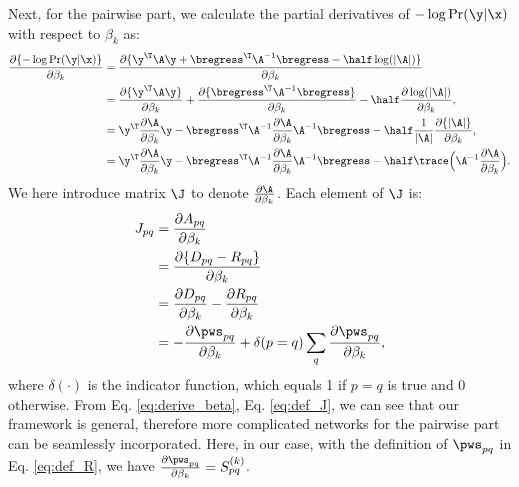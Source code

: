 Next, for the pairwise part, we calculate the  partial derivatives of $-\log\Pr(\y|\x)$ with respect to $\beta_k$ as:
\begin{align}  \label{eq:derive_beta}
\frac{\partial \{ -\log\Pr(\y|\x)\} }{\partial \beta_k} &= \frac{\partial \{\y^\T \A \y + \bregress ^\T \A^{-1} \bregress - \half\log(|\A|)\}}{\partial \beta_k}   \notag \\
&= \frac{\partial \{ \y^\T \A \y \}}{\partial \beta_k} +  \frac{\partial \{\bregress ^\T \A^{-1} \bregress\}}{\partial \beta_k} - \half \frac{\partial \log(|\A|)}{\partial \beta_k}, \notag \\
&=\y^\T\frac{\partial  \A }{\partial \beta_k}\y - \bregress^\T \A^{-1} \frac{\partial \A }{\partial \beta_k} \A^{-1} \bregress  - \half \frac{1}{|\A|} \frac{\partial \{|\A|\} }{\partial \beta_k}, \notag \\
&=\y^\T \frac{\partial  \A }{\partial \beta_k} \y - \bregress^\T \A^{-1} \frac{\partial \A }{\partial \beta_k} \A^{-1} \bregress  - \half \trace \Big ( \A^{-1}  \frac{\partial \A} {\partial \beta_k} \Big ).
\end{align}
We here introduce matrix $\J$ to denote $\frac{\partial  \A }{\partial \beta_k}$. Each element of $\J$ is:
\begin{align}  \label{eq:def_J}
J_{pq} &= \frac{\partial A_{pq}}{\partial \beta_k}  \notag \\
&= \frac{\partial \{ D_{pq} - R_{pq} \} }{\partial \beta_k}  \notag \\
&= \frac{\partial D_{pq}  }{\partial \beta_k}  - \frac{\partial R_{pq}  }{\partial \beta_k} \notag \\
&= - \frac{\partial  \pws_{pq} }{\partial \beta_k} + \delta(p=q) \sum_q \frac{\partial  \pws_{pq} }{\partial \beta_k},
\end{align}
where $\delta(\cdot)$ is the indicator function, which equals 1 if $p=q$ is true and 0 otherwise.
From Eq. \eqref{eq:derive_beta}, Eq. \eqref{eq:def_J}, we can see that our framework is general, therefore more complicated networks for the pairwise part can be seamlessly incorporated.
Here, in our case, with the definition of $\pws_{pq}$ in Eq. \eqref{eq:def_R}, we have $\frac{\partial  \pws_{pq} }{\partial \beta_k}=S_{pq}^{(k)}$.

